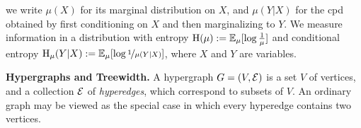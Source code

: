 \documentclass[twoside]{article}
\begin{document}
we write $\mu(X)$ for its marginal distribution on $X$,
and $\mu(Y|X)$ for the cpd obtained by first conditioning on $X$ and then marginalizing to $Y$.
We measure information in a distribution with entropy $\operatorname{\mathrm{H}}(\mu) := \operatorname*{\mathbb{E}}_{\mu} [\log \frac1\mu]$ and conditional entropy $\operatorname{\mathrm{H}}_\mu(Y|X) := \operatorname*{\mathbb{E}}_\mu[\log\nicefrac1{\mu(Y|X)}]$, where $X$ and $Y$ are variables.



\textbf{Hypergraphs and Treewidth.} \label{sec:tw}
A hypergraph $G = (V, \mathcal E)$ is a set $V$ of vertices, and a collection $\mathcal E$ of \emph{hyperedges}, which correspond to subsets of $V$.
An ordinary graph may be viewed as the special case in which every hyperedge contains  two vertices.
\end{document}
